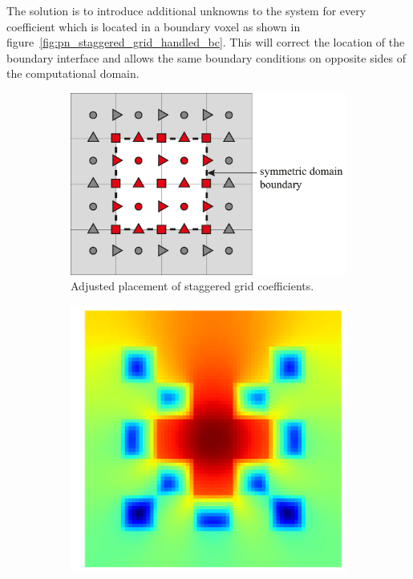 The solution is to introduce additional unknowns to the system for every coefficient which is located in a boundary voxel as shown in figure~\ref{fig:pn_staggered_grid_handled_bc}. This will correct the location of the boundary interface and allows the same boundary conditions on opposite sides of the computational domain.
\begin{figure}[h]
\centering
\begin{subfigure}[t]{0.49\columnwidth}
\centering
\includegraphics[width=1\textwidth]{04_pn_method/figures/fig_staggered_grid_domain_boundary_corrected.pdf}
\caption{Adjusted placement of staggered grid coefficients.}
\label{fig:pn_staggering_correct_bc}
\end{subfigure}%
\hspace{0.01\columnwidth}
\begin{subfigure}[t]{0.34\columnwidth}
\centering
\includegraphics[width=\columnwidth]{04_pn_method/results/checkerboard2d_p5_neumann_staggered.png}

\end{subfigure}
\end{figure}
